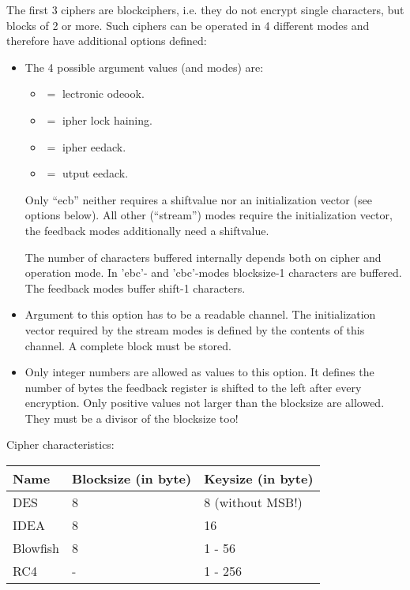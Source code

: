 The first 3 ciphers are blockciphers, i.e. they do not encrypt single
characters, but blocks of 2 or more. Such ciphers can be operated in 4
different modes and therefore have additional options defined:

\begin {itemize}
\item[-mode]	The 4 possible argument values (and modes) are:
	\begin {itemize}
	\item[ecb]	$=$ lectronic odeook.
	\item[cbc]	$=$ ipher lock haining.
	\item[cfb]	$=$ ipher eedack.
	\item[ofb]	$=$ utput eedack.
	\end   {itemize}

	Only ``ecb'' neither requires a shiftvalue nor an initialization
	vector (see options below). All other (``stream'') modes require
	the initialization vector, the feedback modes additionally
	need a shiftvalue.

	The number of characters buffered internally depends both on
	cipher and operation mode.
	In 'ebc'- and 'cbc'-modes blocksize-1 characters are buffered.
	The feedback modes buffer shift-1 characters.


\item[-iv]	Argument to this option has to be a readable
		channel. The initialization vector required by the
		stream modes is defined by the contents of this
		channel. A complete block must be stored.

\item[-shift]	Only integer numbers are allowed as values to this
		option. It defines the number of bytes the feedback
		register is shifted to the left after every
		encryption. Only positive values not larger than the
		blocksize are allowed. They must be a divisor of the
		blocksize too!
\end   {itemize}


Cipher characteristics:

\begin {center}
	\begin {tabular}{|l|l|l|}\hline
	Name		& Blocksize (in byte)	& Keysize (in byte) \\ \hline\hline
	DES		& 8			& 8 (without MSB!) \\ \hline
	IDEA		& 8			& 16 \\ \hline
	Blowfish	& 8			& 1 - 56 \\ \hline\hline
	RC4		& -			& 1 - 256 \\ \hline
	\end   {tabular}
\end   {center}


